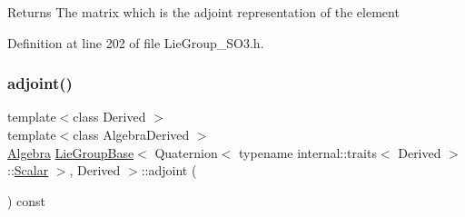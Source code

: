 \begin{DoxyReturn}{Returns}
The matrix which is the adjoint representation of the element 
\end{DoxyReturn}


Definition at line 202 of file Lie\+Group\+\_\+\+S\+O3.\+h.

\hypertarget{class_lie_group_base_3_01_quaternion_3_01typename_01internal_1_1traits_3_01_derived_01_4_1_1_scalar_01_4_00_01_derived_01_4_a0247c73a22ac8b68f598f49141d078e0}{}\label{class_lie_group_base_3_01_quaternion_3_01typename_01internal_1_1traits_3_01_derived_01_4_1_1_scalar_01_4_00_01_derived_01_4_a0247c73a22ac8b68f598f49141d078e0} 
\subsubsection{\texorpdfstring{adjoint()}{adjoint()}\hspace{0.1cm}{\footnotesize\ttfamily [2/2]}}
{\footnotesize\ttfamily template$<$class Derived $>$ \\
template$<$class Algebra\+Derived $>$ \\
\hyperlink{class_lie_group_base_3_01_quaternion_3_01typename_01internal_1_1traits_3_01_derived_01_4_1_1_scalar_01_4_00_01_derived_01_4_a0a25a28e133c962ab8524a766ae6a01c}{Algebra} \hyperlink{class_lie_group_base}{Lie\+Group\+Base}$<$ Quaternion$<$ typename internal\+::traits$<$ Derived $>$\+::\hyperlink{class_lie_group_base_3_01_quaternion_3_01typename_01internal_1_1traits_3_01_derived_01_4_1_1_scalar_01_4_00_01_derived_01_4_afadeceb3b98e52deecc572e71efb82a8}{Scalar} $>$, Derived $>$\+::adjoint (\begin{DoxyParamCaption}\item[{const \hyperlink{class_lie_algebra_base}{Lie\+Algebra\+Base}$<$ Matrix$<$ \hyperlink{class_lie_group_base_3_01_quaternion_3_01typename_01internal_1_1traits_3_01_derived_01_4_1_1_scalar_01_4_00_01_derived_01_4_afadeceb3b98e52deecc572e71efb82a8}{Scalar}, 3, 1 $>$, Algebra\+Derived $>$ \&}]{ }\end{DoxyParamCaption}) const\hspace{0.3cm}{\ttfamily [inline]}}

